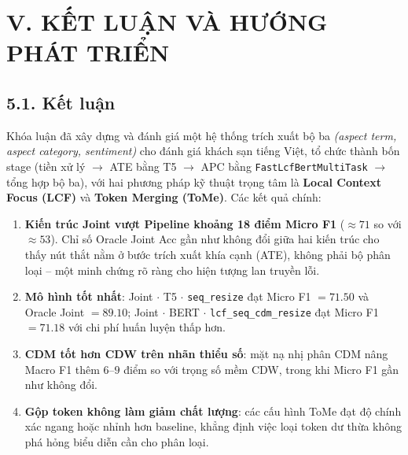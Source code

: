 ﻿%
\chapter{V. KẾT LUẬN VÀ HƯỚNG PHÁT TRIỂN}
\label{chap:ketluan}

\section{5.1. Kết luận}
\label{sec:kl_ketluan}

Khóa luận đã xây dựng và đánh giá một hệ thống trích xuất bộ ba
\textit{(aspect term, aspect category, sentiment)} cho đánh giá khách sạn
tiếng Việt, tổ chức thành bốn stage (tiền xử lý $\to$ ATE bằng T5 $\to$
APC bằng \texttt{FastLcfBertMultiTask} $\to$ tổng hợp bộ ba), với hai
phương pháp kỹ thuật trọng tâm là \textbf{Local Context Focus (LCF)} và
\textbf{Token Merging (ToMe)}. Các kết quả chính:

\begin{enumerate}
  \item \textbf{Kiến trúc Joint vượt Pipeline khoảng 18 điểm Micro F1}
        ($\approx 71$ so với $\approx 53$). Chỉ số Oracle Joint Acc gần
        như không đổi giữa hai kiến trúc cho thấy nút thắt nằm ở bước
        trích xuất khía cạnh (ATE), không phải bộ phân loại -- một minh
        chứng rõ ràng cho hiện tượng lan truyền lỗi.
  \item \textbf{Mô hình tốt nhất}: Joint $\cdot$ T5 $\cdot$
        \texttt{seq\_resize} đạt Micro F1 $= 71.50$ và Oracle Joint
        $= 89.10$; Joint $\cdot$ BERT $\cdot$ \texttt{lcf\_seq\_cdm\_resize}
        đạt Micro F1 $= 71.18$ với chi phí huấn luyện thấp hơn.
  \item \textbf{CDM tốt hơn CDW trên nhãn thiểu số}: mặt nạ nhị phân CDM
        nâng Macro F1 thêm $6$--$9$ điểm so với trọng số mềm CDW, trong
        khi Micro F1 gần như không đổi.
  \item \textbf{Gộp token không làm giảm chất lượng}: các cấu hình ToMe
        đạt độ chính xác ngang hoặc nhỉnh hơn baseline, khẳng định việc
        loại token dư thừa không phá hỏng biểu diễn cần cho phân loại.
\end{enumerate}

